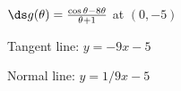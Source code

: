 {$\ds g(\theta) = \frac{\cos \theta - 8\theta}{\theta+1}$ at $(0,-5)$
}
{Tangent line: $y = -9x-5$

Normal line: $y = 1/9x-5$
}
